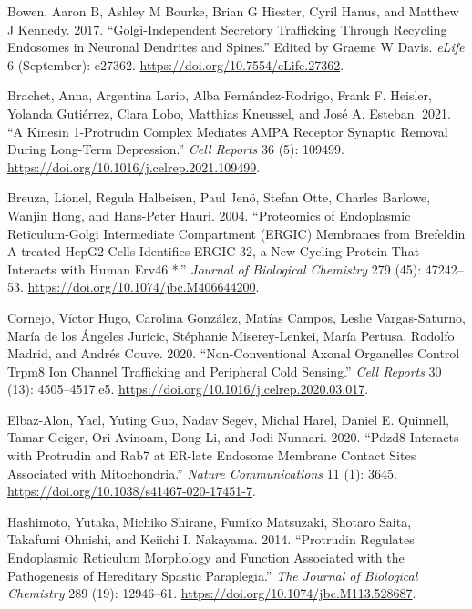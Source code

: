 \documentclass[
]{article}
\newlength{\cslhangindent}
\newlength{\cslentryspacingunit} %
\newenvironment{CSLReferences}[2] %
 {%
  \setlength{\parindent}{0pt}
  \ifodd #1
  \let\oldpar\par
  \def\par{\hangindent=\cslhangindent\oldpar}
  \fi
  \setlength{\parskip}{#2\cslentryspacingunit}
 }%
 {}
\begin{document}
\hypertarget{refs}{}
\begin{CSLReferences}{1}{0}
\leavevmode{}%
Bowen, Aaron B, Ashley M Bourke, Brian G Hiester, Cyril Hanus, and
Matthew J Kennedy. 2017. {``Golgi-Independent Secretory Trafficking
Through Recycling Endosomes in Neuronal Dendrites and Spines.''} Edited
by Graeme W Davis. \emph{eLife} 6 (September): e27362.
\url{https://doi.org/10.7554/eLife.27362}.

\leavevmode{}%
Brachet, Anna, Argentina Lario, Alba Fernández-Rodrigo, Frank F.
Heisler, Yolanda Gutiérrez, Clara Lobo, Matthias Kneussel, and José A.
Esteban. 2021. {``A Kinesin 1-Protrudin Complex Mediates {AMPA} Receptor
Synaptic Removal During Long-Term Depression.''} \emph{Cell Reports} 36
(5): 109499. \url{https://doi.org/10.1016/j.celrep.2021.109499}.

\leavevmode{}%
Breuza, Lionel, Regula Halbeisen, Paul Jenö, Stefan Otte, Charles
Barlowe, Wanjin Hong, and Hans-Peter Hauri. 2004. {``Proteomics of
{Endoplasmic Reticulum-Golgi Intermediate Compartment} ({ERGIC})
{Membranes} from {Brefeldin A-treated HepG2 Cells Identifies ERGIC-32},
a {New Cycling Protein That Interacts} with {Human Erv46} *.''}
\emph{Journal of Biological Chemistry} 279 (45): 47242--53.
\url{https://doi.org/10.1074/jbc.M406644200}.

\leavevmode{}%
Cornejo, Víctor Hugo, Carolina González, Matías Campos, Leslie
Vargas-Saturno, María de los Ángeles Juricic, Stéphanie Miserey-Lenkei,
María Pertusa, Rodolfo Madrid, and Andrés Couve. 2020.
{``Non-Conventional {Axonal Organelles Control Trpm8 Ion Channel
Trafficking} and {Peripheral Cold Sensing}.''} \emph{Cell Reports} 30
(13): 4505--4517.e5. \url{https://doi.org/10.1016/j.celrep.2020.03.017}.

\leavevmode{}%
Elbaz-Alon, Yael, Yuting Guo, Nadav Segev, Michal Harel, Daniel E.
Quinnell, Tamar Geiger, Ori Avinoam, Dong Li, and Jodi Nunnari. 2020.
{``{Pdzd8} Interacts with {Protrudin} and {Rab7} at {ER-late} Endosome
Membrane Contact Sites Associated with Mitochondria.''} \emph{Nature
Communications} 11 (1): 3645.
\url{https://doi.org/10.1038/s41467-020-17451-7}.

\leavevmode{}%
Hashimoto, Yutaka, Michiko Shirane, Fumiko Matsuzaki, Shotaro Saita,
Takafumi Ohnishi, and Keiichi I. Nakayama. 2014. {``Protrudin Regulates
Endoplasmic Reticulum Morphology and Function Associated with the
Pathogenesis of Hereditary Spastic Paraplegia.''} \emph{The Journal of
Biological Chemistry} 289 (19): 12946--61.
\url{https://doi.org/10.1074/jbc.M113.528687}.


\end{CSLReferences}
\end{document}
